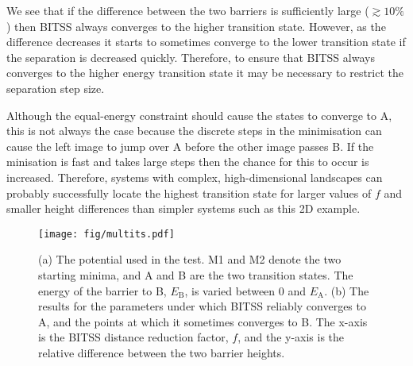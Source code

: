 \documentclass[aip,jcp,11pt]{revtex4-2}
\begin{document}
We see that if the difference between the two barriers is sufficiently large ($\gtrsim 10\%$) then BITSS always converges to the higher transition state.
However, as the difference decreases it starts to sometimes converge to the lower transition state if the separation is decreased quickly.
Therefore, to ensure that BITSS always converges to the higher energy transition state it may be necessary to restrict the separation step size.

Although the equal-energy constraint should cause the states to converge to A, this is not always the case because the discrete steps in the minimisation can cause the left image to jump over A before the other image passes B.
If the minisation is fast and takes large steps then the chance for this to occur is increased.
Therefore, systems with complex, high-dimensional landscapes can probably successfully locate the highest transition state for larger values of $f$ and smaller height differences than simpler systems such as this 2D example.

\begin{figure}[htb]
  \texttt{[image: fig/multits.pdf]}
  \caption{\label{fig:multits}
    (a) The potential used in the test.
    M1 and M2 denote the two starting minima, and A and B are the two transition states.
    The energy of the barrier to B, $E_\text{B}$, is varied between 0 and $E_\text{A}$.
    (b) The results for the parameters under which BITSS reliably converges to A, and the points at which it sometimes converges to B.
    The x-axis is the BITSS distance reduction factor, $f$, and the y-axis is the relative difference between the two barrier heights.
  }
\end{figure}



% 
\end{document}
